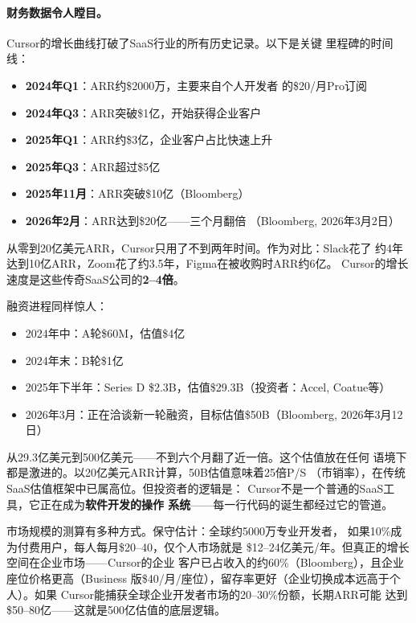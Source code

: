 \paragraph{财务数据令人瞠目。}
Cursor的增长曲线打破了SaaS行业的所有历史记录。以下是关键
里程碑的时间线：

\begin{itemize}
  \item \textbf{2024年Q1}：ARR约\$2000万，主要来自个人开发者
    的\$20/月Pro订阅
  \item \textbf{2024年Q3}：ARR突破\$1亿，开始获得企业客户
  \item \textbf{2025年Q1}：ARR约\$3亿，企业客户占比快速上升
  \item \textbf{2025年Q3}：ARR超过\$5亿
  \item \textbf{2025年11月}：ARR突破\$10亿（Bloomberg）
  \item \textbf{2026年2月}：ARR达到\$20亿——三个月翻倍
    （Bloomberg, 2026年3月2日）
\end{itemize}

从零到20亿美元ARR，Cursor只用了不到两年时间。作为对比：Slack花了
约4年达到10亿ARR，Zoom花了约3.5年，Figma在被收购时ARR约6亿。
Cursor的增长速度是这些传奇SaaS公司的\textbf{2--4倍}。

融资进程同样惊人：
\begin{itemize}
  \item 2024年中：A轮\$60M，估值\$4亿
  \item 2024年末：B轮\$1亿
  \item 2025年下半年：Series D \$2.3B，估值\$29.3B（投资者：Accel,
    Coatue等）
  \item 2026年3月：正在洽谈新一轮融资，目标估值\$50B（Bloomberg,
    2026年3月12日）
\end{itemize}

从29.3亿美元到500亿美元——不到六个月翻了近一倍。这个估值放在任何
语境下都是激进的。以20亿美元ARR计算，50B估值意味着25倍P/S
（市销率），在传统SaaS估值框架中已属高位。但投资者的逻辑是：
Cursor不是一个普通的SaaS工具，它正在成为\textbf{软件开发的操作
系统}——每一行代码的诞生都经过它的管道。

市场规模的测算有多种方式。保守估计：全球约5000万专业开发者，
如果10\%成为付费用户，每人每月\$20--40，仅个人市场就是
\$12--24亿美元/年。但真正的增长空间在企业市场——Cursor的企业
客户已占收入的约60\%（Bloomberg），且企业座位价格更高（Business
版\$40/月/座位），留存率更好（企业切换成本远高于个人）。如果
Cursor能捕获全球企业开发者市场的20--30\%份额，长期ARR可能
达到\$50--80亿——这就是500亿估值的底层逻辑。

